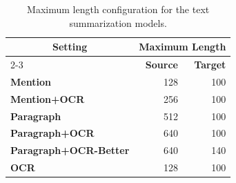 \begin{table}[t]
    \centering \small
    
    \begin{tabular}{lrr}
    \toprule
    \multicolumn{1}{c}{\multirow{2}{*}{\textbf{Setting}}} & \multicolumn{2}{c}{\textbf{Maximum Length}} \\ \cmidrule{2-3}
    & \textbf{Source} & \textbf{Target} \\ \midrule
    \textbf{Mention}        & 128 & 100 \\
    \textbf{Mention+OCR}    & 256 & 100 \\ 
    \textbf{Paragraph}      & 512 & 100 \\
    \textbf{Paragraph+OCR}  & 640 & 100 \\
    \textbf{Paragraph+OCR-Better} & 640 & 140 \\
    \textbf{OCR}            & 128 & 100 \\
    \bottomrule
    \end{tabular}
    \vspace{-2mm}
    \caption{Maximum length configuration for the text summarization models.}
    \label{tab:length-setting}
    \vspace{-2mm}
\end{table}